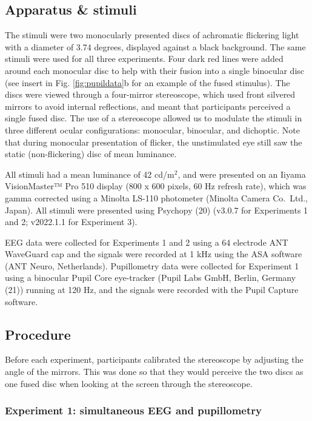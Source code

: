 \documentclass[
]{article}
\begin{document}
\hypertarget{apparatus-stimuli}{%
\subsection{Apparatus \& stimuli}\label{apparatus-stimuli}}

The stimuli were two monocularly presented discs of achromatic flickering light with a diameter of 3.74 degrees, displayed against a black background. The same stimuli were used for all three experiments. Four dark red lines were added around each monocular disc to help with their fusion into a single binocular disc (see insert in Fig. \ref{fig:pupildata}b for an example of the fused stimulus). The discs were viewed through a four-mirror stereoscope, which used front silvered mirrors to avoid internal reflections, and meant that participants perceived a single fused disc. The use of a stereoscope allowed us to modulate the stimuli in three different ocular configurations: monocular, binocular, and dichoptic. Note that during monocular presentation of flicker, the unstimulated eye still saw the static (non-flickering) disc of mean luminance.

All stimuli had a mean luminance of 42 cd/m\(^2\), and were presented on an Iiyama VisionMaster™ Pro 510 display (800 x 600 pixels, 60 Hz refresh rate), which was gamma corrected using a Minolta LS-110 photometer (Minolta Camera Co.~Ltd., Japan). All stimuli were presented using Psychopy (20) (v3.0.7 for Experiments 1 and 2; v2022.1.1 for Experiment 3).

EEG data were collected for Experiments 1 and 2 using a 64 electrode ANT WaveGuard cap and the signals were recorded at 1 kHz using the ASA software (ANT Neuro, Netherlands). Pupillometry data were collected for Experiment 1 using a binocular Pupil Core eye-tracker (Pupil Labs GmbH, Berlin, Germany (21)) running at 120 Hz, and the signals were recorded with the Pupil Capture software.

\hypertarget{procedure}{%
\subsection{Procedure}\label{procedure}}

Before each experiment, participants calibrated the stereoscope by adjusting the angle of the mirrors. This was done so that they would perceive the two discs as one fused disc when looking at the screen through the stereoscope.

\hypertarget{experiment-1-simultaneous-eeg-and-pupillometry}{%
\subsubsection{Experiment 1: simultaneous EEG and pupillometry}\label{experiment-1-simultaneous-eeg-and-pupillometry}}
\end{document}
